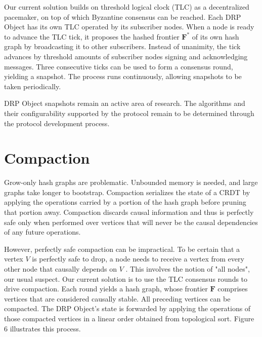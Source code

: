\documentclass{article}
\begin{document}
Our current solution builds on threshold logical clock (TLC) \cite{TLC} as a decentralized pacemaker, on top of which Byzantine consensus can be reached. Each DRP Object has its own TLC operated by its subscriber nodes. When a node is ready to advance the TLC tick, it proposes the hashed frontier $\textbf{F}^*$ of its own hash graph by broadcasting it to other subscribers. Instead of unanimity, the tick advances by threshold amounts of subscriber nodes signing and acknowledging messages. Three consecutive ticks can be used to form a consensus round, yielding a snapshot. The process runs continuously, allowing snapshots to be taken periodically.

DRP Object snapshots remain an active area of research. The algorithms and their configurability supported by the protocol remain to be determined through the protocol development process.

\section{Compaction}
\label{sec:headings}

Grow-only hash graphs are problematic. Unbounded memory is needed, and large graphs take longer to bootstrap. Compaction serializes the state of a CRDT by applying the operations carried by a portion of the hash graph before pruning that portion away. Compaction discards causal information and thus is perfectly safe only when performed over vertices that will never be the causal dependencies of any future operations.

However, perfectly safe compaction can be impractical. To be certain that a vertex $V$ is perfectly safe to drop, a node needs to receive a vertex from every other node that causally depends on $V$ \cite{PO-CRDT}. This involves the notion of "all nodes", our usual suspect. Our current solution is to use the TLC consensus rounds to drive compaction. Each round yields a hash graph, whose frontier $\textbf{F}$ comprises vertices that are considered causally stable. All preceding vertices can be compacted. The DRP Object's state is forwarded by applying the operations of those compacted vertices in a linear order obtained from topological sort. Figure 6 illustrates this process.
\end{document}
